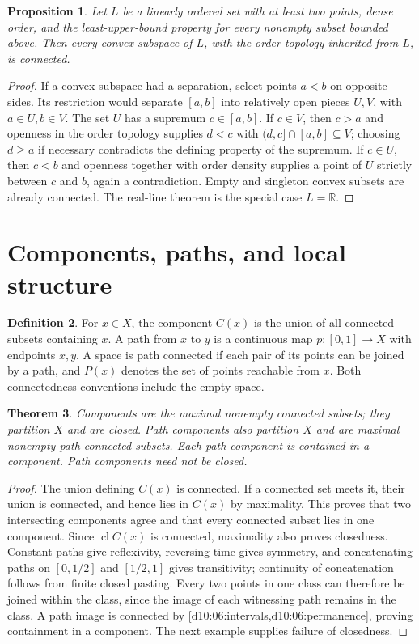 \documentclass[11pt,oneside,openany]{book}
\newtheorem{theorem}{Theorem}[chapter]
\newtheorem{proposition}[theorem]{Proposition}
\theoremstyle{definition}
\newtheorem{definition}[theorem]{Definition}
\theoremstyle{remark}
\newcommand{\R}{\mathbb R}\newcommand{\C}{\mathbb C}
\DeclareMathOperator{\cl}{cl}
\begin{document}
\begin{proposition}\label{d10:06:linear-continuum}
Let $L$ be a linearly ordered set with at least two points, dense order, and the least-upper-bound property for every nonempty subset bounded above. Then every convex subspace of $L$, with the order topology inherited from $L$, is connected.
\end{proposition}
\begin{proof}
If a convex subspace had a separation, select points $a<b$ on opposite sides. Its restriction would separate $[a,b]$ into relatively open pieces $U,V$, with $a\in U,b\in V$. The set $U$ has a supremum $c\in[a,b]$. If $c\in V$, then $c>a$ and openness in the order topology supplies $d<c$ with $(d,c]\cap[a,b]\subseteq V$; choosing $d\geq a$ if necessary contradicts the defining property of the supremum. If $c\in U$, then $c<b$ and openness together with order density supplies a point of $U$ strictly between $c$ and $b$, again a contradiction. Empty and singleton convex subsets are already connected. The real-line theorem is the special case $L=\R$.
\end{proof}

\section{Components, paths, and local structure}
\begin{definition}\label{d10:06:components}
For $x\in X$, the component $C(x)$ is the union of all connected subsets containing $x$. A path from $x$ to $y$ is a continuous map $p:[0,1]\to X$ with endpoints $x,y$. A space is path connected if each pair of its points can be joined by a path, and $P(x)$ denotes the set of points reachable from $x$. Both connectedness conventions include the empty space.
\end{definition}

\begin{theorem}\label{d10:06:component-partition}
Components are the maximal nonempty connected subsets; they partition $X$ and are closed. Path components also partition $X$ and are maximal nonempty path connected subsets. Each path component is contained in a component. Path components need not be closed.
\end{theorem}
\begin{proof}
The union defining $C(x)$ is connected. If a connected set meets it, their union is connected, and hence lies in $C(x)$ by maximality. This proves that two intersecting components agree and that every connected subset lies in one component. Since $\cl C(x)$ is connected, maximality also proves closedness. Constant paths give reflexivity, reversing time gives symmetry, and concatenating paths on $[0,1/2]$ and $[1/2,1]$ gives transitivity; continuity of concatenation follows from finite closed pasting. Every two points in one class can therefore be joined within the class, since the image of each witnessing path remains in the class. A path image is connected by \cref{d10:06:intervals,d10:06:permanence}, proving containment in a component. The next example supplies failure of closedness.
\end{proof}
\end{document}
